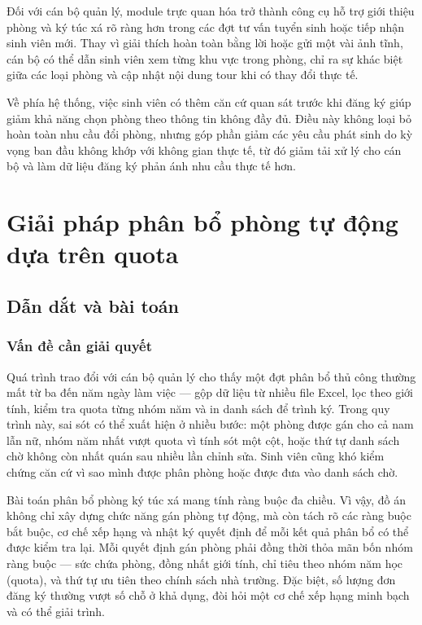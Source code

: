 \documentclass[../DoAn.tex]{subfiles}
\begin{document}
Đối với cán bộ quản lý, module trực quan hóa trở thành công cụ hỗ trợ giới
thiệu phòng và ký túc xá rõ ràng hơn trong các đợt tư vấn tuyển sinh hoặc tiếp
nhận sinh viên mới. Thay vì giải thích hoàn toàn bằng lời hoặc gửi một vài ảnh
tĩnh, cán bộ có thể dẫn sinh viên xem từng khu vực trong phòng, chỉ ra sự khác
biệt giữa các loại phòng và cập nhật nội dung tour khi có thay đổi thực tế.

Về phía hệ thống, việc sinh viên có thêm căn cứ quan sát trước khi đăng ký giúp
giảm khả năng chọn phòng theo thông tin không đầy đủ. Điều này không loại bỏ
hoàn toàn nhu cầu đổi phòng, nhưng góp phần giảm các yêu cầu phát sinh do kỳ
vọng ban đầu không khớp với không gian thực tế, từ đó giảm tải xử lý cho cán bộ
và làm dữ liệu đăng ký phản ánh nhu cầu thực tế hơn.




\section{Giải pháp phân bổ phòng tự động dựa trên quota}
\label{sec:contrib_allocation}

\subsection{Dẫn dắt và bài toán}
\label{subsec:alloc_problem}

\subsubsection{Vấn đề cần giải quyết}

Quá trình trao đổi với cán bộ quản lý cho thấy một đợt phân bổ thủ công
thường mất từ ba đến năm ngày làm việc --- gộp dữ liệu từ nhiều file Excel, lọc
theo giới tính, kiểm tra quota từng nhóm năm và in danh sách để trình ký. Trong
quy trình này, sai sót có thể xuất hiện ở nhiều bước: một phòng được gán cho cả
nam lẫn nữ, nhóm năm nhất vượt quota vì tính sót một cột, hoặc thứ tự danh sách
chờ không còn nhất quán sau nhiều lần chỉnh sửa. Sinh viên cũng khó kiểm chứng
căn cứ vì sao mình được phân phòng hoặc được đưa vào danh sách chờ.

Bài toán phân bổ phòng ký túc xá mang tính ràng buộc đa chiều. Vì vậy, đồ án
không chỉ xây dựng chức năng gán phòng tự động, mà còn tách rõ các ràng buộc
bắt buộc, cơ chế xếp hạng và nhật ký quyết định để mỗi kết quả phân bổ có thể
được kiểm tra lại. Mỗi quyết định gán phòng phải đồng thời thỏa mãn bốn nhóm
ràng buộc --- sức chứa phòng, đồng nhất giới tính, chỉ tiêu theo nhóm năm học
(quota), và thứ tự ưu tiên theo chính sách nhà trường. Đặc biệt, số lượng đơn
đăng ký thường vượt số chỗ ở khả dụng, đòi hỏi một cơ chế xếp hạng minh bạch
và có thể giải trình.
\end{document}
